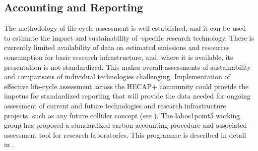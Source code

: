 \documentclass[../SustainableHEP.tex]{subfiles}
\begin{document}
\subsection{Accounting and Reporting}

The methodology of life-cycle assessment is well established, and it can be used to estimate the impact and sustainability of \ACR-specific research technology. There is currently limited availability of data on estimated emissions and resources consumption for basic research infrastructure, and, where it is available, its presentation is not standardized. This makes overall assessments of sustainability and comparisons of individual technologies challenging. Implementation of effective life-cycle assessment across the HECAP+ community could provide the impetus for standardized reporting that will provide the data needed for ongoing assessment of current and future technologies and research infrastructure projects, such as any future collider concept (see ). The labos1point5 working group has proposed a standardized carbon accounting procedure and associated assessment tool for research laboratories. This programme is described in detail in .
\end{document}
